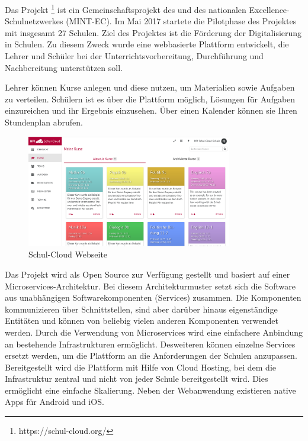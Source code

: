 Das Projekt \schulCloud\footnote{https://schul-cloud.org/} ist ein Gemeinschaftsprojekt des \hpi und des nationalen Excellence-Schulnetzwerkes (MINT-EC). Im Mai 2017 startete die Pilotphase des Projektes mit insgesamt 27 Schulen. Ziel des Projektes ist die Förderung der Digitalisierung in Schulen. 
Zu diesem Zweck wurde eine webbasierte Plattform entwickelt, die Lehrer und Schüler bei der Unterrichtsvorbereitung, Durchführung und Nachbereitung unterstützen soll. 

Lehrer können Kurse anlegen und diese nutzen, um Materialien sowie Aufgaben zu verteilen. Schülern ist es über die Plattform möglich, Lösungen für Aufgaben einzureichen und ihr Ergebnis einzusehen. Über einen Kalender können sie Ihren Stundenplan abrufen.
\begin{figure}[!h]
	\centering
	\includegraphics[width=0.8\textwidth]{figures/screenshot_schul-cloud}
	\caption[A Figure Short-Title]{Schul-Cloud Webseite}
	\label{fig:screenshot_schul-clould}
\end{figure}

Das Projekt wird als Open Source zur Verfügung gestellt und basiert auf einer Microservices-Architektur. Bei diesem Architekturmuster setzt sich die Software aus unabhängigen Softwarekomponenten (Services) zusammen. Die Komponenten kommunizieren über Schnittstellen, sind aber darüber hinaus eigenständige Entitäten und können von beliebig vielen anderen Komponenten verwendet werden. Durch die Verwendung von Microservices wird eine einfachere Anbindung an bestehende Infrastrukturen ermöglicht. Desweiteren können einzelne Services ersetzt werden, um die Plattform an die Anforderungen der Schulen anzupassen. Bereitgestellt wird die Plattform mit Hilfe von Cloud Hosting, bei dem die Infrastruktur zentral und nicht von jeder Schule bereitgestellt wird. Dies ermöglicht eine einfache Skalierung. Neben der Webanwendung existieren native Apps für Android und iOS.


